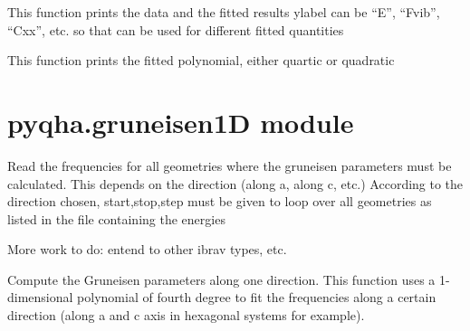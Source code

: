 \documentclass[letterpaper,10pt,english]{sphinxmanual}
\begin{document}

\begin{fulllineitems}
\label{pyqha:pyqha.fitutils.print_data}
This function prints the data and the fitted results 
ylabel can be ``E'', ``Fvib'', ``Cxx'', etc. so that can be used for different
fitted quantities

\end{fulllineitems}


\begin{fulllineitems}
\label{pyqha:pyqha.fitutils.print_polynomial}
This function prints the fitted polynomial, either quartic or quadratic

\end{fulllineitems}



\section{pyqha.gruneisen1D module}
\label{pyqha:pyqha-gruneisen1d-module}\label{pyqha:module-pyqha.gruneisen1D}

\begin{fulllineitems}
\label{pyqha:pyqha.gruneisen1D.compute_grun}
Read the frequencies for all geometries where the gruneisen parameters must be
calculated. This depends on the direction (along a, along c, etc.)
According to the direction chosen, start,stop,step must be given to loop over 
all geometries as listed in the file containing the energies

More work to do: entend to other ibrav types, etc.

\end{fulllineitems}


\begin{fulllineitems}
\label{pyqha:pyqha.gruneisen1D.compute_grun_along_one_direction}
Compute the Gruneisen parameters along one direction.
This function uses a 1-dimensional polynomial of fourth degree to fit the 
frequencies along a certain direction (along a and c axis in hexagonal systems
for example).

\end{fulllineitems}
\end{document}
